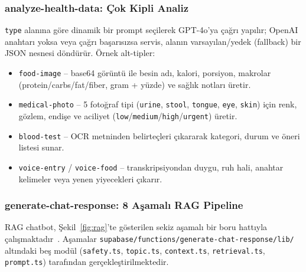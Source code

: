 \subsubsection{analyze-health-data: Çok Kipli Analiz}

\texttt{type} alanına göre dinamik bir prompt seçilerek GPT-4o'ya çağrı yapılır; OpenAI anahtarı yoksa veya çağrı başarısızsa servis, alanın varsayılan/yedek (fallback) bir JSON nesnesi döndürür. Örnek alt-tipler:
\begin{itemize}
    \item \texttt{food-image} -- base64 görüntü ile besin adı, kalori, porsiyon, makrolar (protein/carbs/fat/fiber, gram + yüzde) ve sağlık notları üretir.
    \item \texttt{medical-photo} -- 5 fotoğraf tipi (\texttt{urine}, \texttt{stool}, \texttt{tongue}, \texttt{eye}, \texttt{skin}) için renk, gözlem, endişe ve aciliyet (\texttt{low}/\texttt{medium}/\texttt{high}/\texttt{urgent}) üretir.
    \item \texttt{blood-test} -- OCR metninden belirteçleri çıkararak kategori, durum ve öneri listesi sunar.
    \item \texttt{voice-entry} / \texttt{voice-food} -- transkripsiyondan duygu, ruh hali, anahtar kelimeler veya yenen yiyecekleri çıkarır.
\end{itemize}

\subsubsection{generate-chat-response: 8 Aşamalı RAG Pipeline}

RAG chatbot, Şekil~\ref{fig:rag}'te gösterilen sekiz aşamalı bir boru hattıyla çalışmaktadır~\cite{Lewis2020RAG}. Aşamalar \texttt{supabase/functions/generate-chat-response/lib/} altındaki beş modül (\texttt{safety.ts}, \texttt{topic.ts}, \texttt{context.ts}, \texttt{retrieval.ts}, \texttt{prompt.ts}) tarafından gerçekleştirilmektedir.

